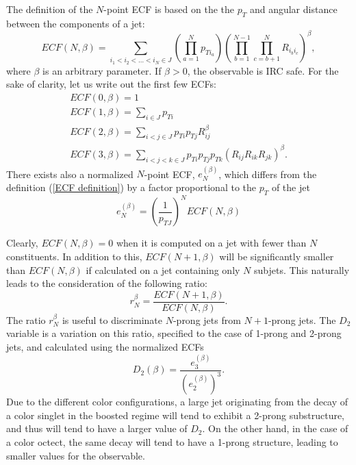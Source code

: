 \documentclass[10pt,a4paper]{book}
\begin{document}
The definition of the $N$-point ECF is based on the  the $p_T$ and angular distance between the components of a jet:
\begin{equation}
ECF(N,\beta) = \sum_{i_1 < i_2 < \dots < i_N \in J} \left( \prod_{a = 1}^N p_{Ti_a} \right) \left(\prod_{b = 1}^{N-1} \prod_{c = b + 1}^N  R_{i_b i_c}\right)^\beta,
\label{ECF definition}
\end{equation}
where $\beta$ is an arbitrary parameter. If $\beta > 0$, the observable is IRC safe. 
For the sake of clarity, let us write out the first few ECFs:
\begin{gather*}
ECF(0, \beta) = 1\\
ECF(1, \beta) = \sum_{i\in J}p_{Ti} \\
ECF(2, \beta) = \sum_{i < j \in J} p_{Ti}p_{Tj} R_{ij}^\beta \\
ECF(3, \beta) = \sum_{i < j < k \in J} p_{Ti}p_{Tj}p_{Tk} \left(R_{ij}R_{ik}R_{jk}\right)^\beta.
\end{gather*}
There exists also a normalized $N$-point ECF, $e^{(\beta)}_N$, which differs from the definition (\ref{ECF definition}) by a factor proportional to the $p_T$ of the jet
\begin{equation}
e^{(\beta)}_N = \left(\frac{1}{p_{TJ}}\right)^N ECF(N,\beta)
\end{equation}

Clearly, $ECF(N,\beta) = 0$ when it is computed on a jet with fewer than $N$ constituents. In addition to this, $ECF(N+1, \beta)$ will be significantly smaller than $ECF(N,\beta)$ if calculated on a jet containing only $N$ subjets. This naturally leads to the consideration of the following ratio:
\begin{equation}
r_N^\beta = \frac{ECF(N+1,\beta)}{ECF(N,\beta)}.
\end{equation}
The ratio $r_N^\beta$ is useful to discriminate $N$-prong jets from $N+1$-prong jets. The $D_2$ variable \cite{Larkoski:2014gra} is a variation on this ratio, specified to the case of 1-prong and 2-prong jets, and calculated using the normalized ECFs
\begin{equation}
D_2(\beta) = \frac{e^{(\beta)}_3}{(e^{(\beta)}_2)^3}.
\end{equation}
Due to the different color configurations, a large jet originating from the decay of a color singlet in the boosted regime will tend to exhibit a 2-prong substructure, and thus will tend to have a larger value of $D_2$. On the other hand, in the case of a color octect, the same decay will tend to have a 1-prong structure, leading to smaller values for the observable.
\end{document}
